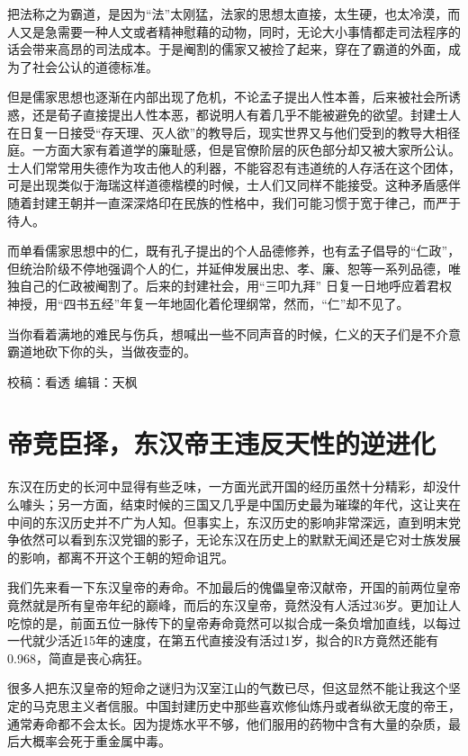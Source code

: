 \documentclass[
]{book}
\begin{document}
把法称之为霸道，是因为``法''太刚猛，法家的思想太直接，太生硬，也太冷漠，而人又是急需要一种人文或者精神慰藉的动物，同时，无论大小事情都走司法程序的话会带来高昂的司法成本。于是阉割的儒家又被捡了起来，穿在了霸道的外面，成为了社会公认的道德标准。

但是儒家思想也逐渐在内部出现了危机，不论孟子提出人性本善，后来被社会所诱惑，还是荀子直接提出人性本恶，都说明人有着几乎不能被避免的欲望。封建士人在日复一日接受``存天理、灭人欲''的教导后，现实世界又与他们受到的教导大相径庭。一方面大家有着道学的廉耻感，但是官僚阶层的灰色部分却又被大家所公认。士人们常常用失德作为攻击他人的利器，不能容忍有违道统的人存活在这个团体，可是出现类似于海瑞这样道德楷模的时候，士人们又同样不能接受。这种矛盾感伴随着封建王朝并一直深深烙印在民族的性格中，我们可能习惯于宽于律己，而严于待人。

而单看儒家思想中的仁，既有孔子提出的个人品德修养，也有孟子倡导的``仁政''，但统治阶级不停地强调个人的仁，并延伸发展出忠、孝、廉、恕等一系列品德，唯独自己的仁政被阉割了。后来的封建社会，用``三叩九拜'' 日复一日地呼应着君权神授，用``四书五经''年复一年地固化着伦理纲常，然而，``仁''却不见了。

当你看着满地的难民与伤兵，想喊出一些不同声音的时候，仁义的天子们是不介意霸道地砍下你的头，当做夜壶的。

校稿：看透
编辑：天枫

\hypertarget{ux5e1dux7adeux81e3ux62e9ux4e1cux6c49ux5e1dux738bux8fddux53cdux5929ux6027ux7684ux9006ux8fdbux5316}{%
\section{帝竞臣择，东汉帝王违反天性的逆进化}\label{ux5e1dux7adeux81e3ux62e9ux4e1cux6c49ux5e1dux738bux8fddux53cdux5929ux6027ux7684ux9006ux8fdbux5316}}

东汉在历史的长河中显得有些乏味，一方面光武开国的经历虽然十分精彩，却没什么噱头；另一方面，结束时候的三国又几乎是中国历史最为璀璨的年代，这让夹在中间的东汉历史并不广为人知。但事实上，东汉历史的影响非常深远，直到明末党争依然可以看到东汉党锢的影子，无论东汉在历史上的默默无闻还是它对士族发展的影响，都离不开这个王朝的短命诅咒。

我们先来看一下东汉皇帝的寿命。不加最后的傀儡皇帝汉献帝，开国的前两位皇帝竟然就是所有皇帝年纪的巅峰，而后的东汉皇帝，竟然没有人活过36岁。更加让人吃惊的是，前面五位一脉传下的皇帝寿命竟然可以拟合成一条负增加直线，以每过一代就少活近15年的速度，在第五代直接没有活过1岁，拟合的R方竟然还能有0.968，简直是丧心病狂。

很多人把东汉皇帝的短命之谜归为汉室江山的气数已尽，但这显然不能让我这个坚定的马克思主义者信服。中国封建历史中那些喜欢修仙炼丹或者纵欲无度的帝王，通常寿命都不会太长。因为提炼水平不够，他们服用的药物中含有大量的杂质，最后大概率会死于重金属中毒。
\end{document}
